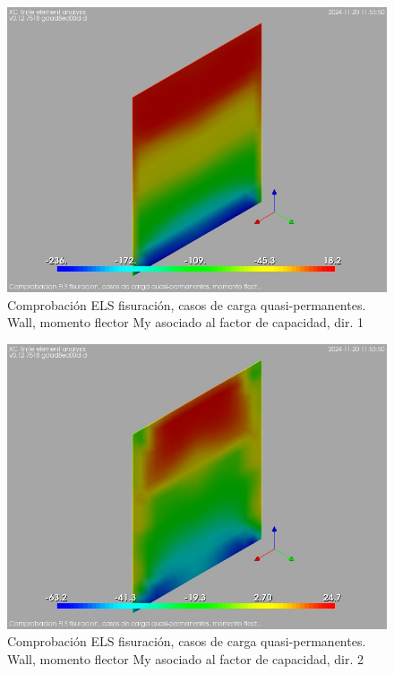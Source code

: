 \begin{figure}[ht]
\begin{center}
\includegraphics[width=\linewidth]{results/graphics/crackingSLS_qperm/wallMySect1}
\caption{Comprobación ELS fisuración, casos de carga quasi-permanentes. Wall, momento flector My asociado al factor de capacidad, dir. 1}
\label{SLS_quasiPermanentLoadsCrackControlwallMySect1}
\end{center}
\end{figure}
\begin{figure}[ht]
\begin{center}
\includegraphics[width=\linewidth]{results/graphics/crackingSLS_qperm/wallMySect2}
\caption{Comprobación ELS fisuración, casos de carga quasi-permanentes. Wall, momento flector My asociado al factor de capacidad, dir. 2}
\label{SLS_quasiPermanentLoadsCrackControlwallMySect2}
\end{center}
\end{figure}
